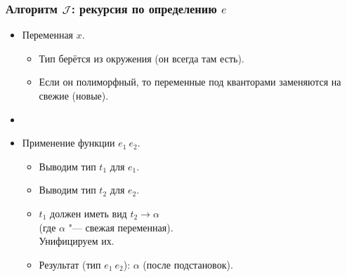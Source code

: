 \documentclass[11pt]{beamer}
\begin{document}
\begin{frame}[fragile]
  \frametitle{Алгоритм $\mathcal{J}$: рекурсия по определению $e$}
  \begin{itemize}
    \item Переменная $x$.
          \pause
          \begin{itemize}
            \item Тип берётся из окружения (он всегда там есть).
            \item Если он полиморфный, то переменные под кванторами заменяются на свежие (новые).
          \end{itemize}
          \pause
    \item[]
    \item Применение функции $e_1~e_2$.
          \pause
          \begin{itemize}
            \item Выводим тип $t_1$ для $e_1$.
            \item Выводим тип $t_2$ для $e_2$.
            \item $t_1$ должен иметь вид $t_2 \to \alpha$ \\(где $\alpha$ "--- свежая переменная).
                  \\Унифицируем их.
            \item Результат (тип $e_1~e_2$): \pause $\alpha$ (после подстановок).
          \end{itemize}
  \end{itemize}
\end{frame}
\end{document}

